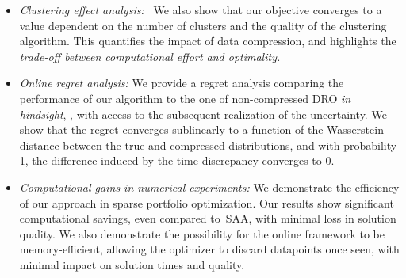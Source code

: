 \begin{itemize}
    \item {\it Clustering effect analysis:}  
    ~We also show that our objective converges to a value dependent on the number of clusters and the quality of the clustering algorithm. 
    This quantifies the impact of data compression, and highlights the {\it trade-off between computational effort and optimality.}
    \item {\it Online regret analysis:} 
    We provide a regret analysis comparing the performance of our algorithm to the one of non-compressed \gls{DRO} {\it in hindsight}, \ie, with access to the subsequent realization of the uncertainty. 
    We show that the regret converges sublinearly to a function of the Wasserstein distance between the true and compressed distributions, and with probability 1, the difference induced by the time-discrepancy converges to 0.
    \item {\it Computational gains in numerical experiments:} We demonstrate the efficiency of our approach in sparse portfolio optimization. Our results show significant computational savings, even compared to~\gls{SAA}, with minimal loss in solution quality.
    We also demonstrate the possibility for the online framework to be memory-efficient, allowing the optimizer to discard datapoints once seen, with minimal impact on solution times and quality.  

\end{itemize}

